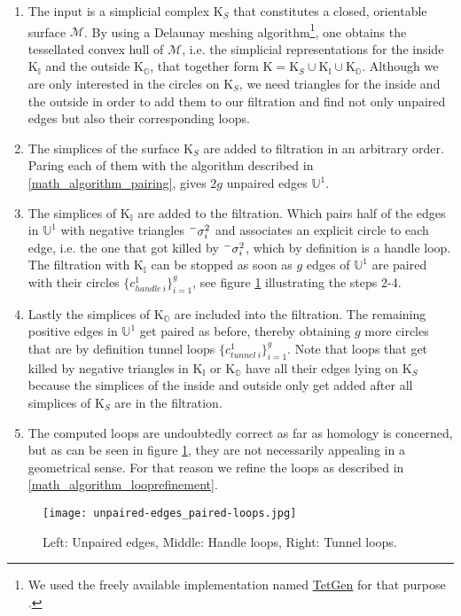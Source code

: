 \begin{enumerate}
\setlength{\itemsep}{0cm}
\setlength{\parskip}{0.15cm}
\item The input is a simplicial complex $\mathrm{K}_{S}$ that constitutes a closed, orientable surface $\mathcal{M}$. By using a Delaunay meshing algorithm\footnote{ We used the freely available implementation named \href{http://tetgen.berlios.de/}{TetGen} for that purpose \citep[cf.][]{Si2010}.}, one obtains the tessellated convex hull of $\mathcal{M}$, i.e. the simplicial representations for the inside $\mathrm{K}_{\mathbb{I}}$ and the outside $\mathrm{K}_{\mathbb{O}}$, that together form $\mathrm{K} = \mathrm{K}_{S} \cup \mathrm{K}_{\mathbb{I}} \cup \mathrm{K}_{\mathbb{O}}$. Although we are only interested in the circles on $\mathrm{K}_{S}$, we need triangles for the inside and the outside in order to add them to our filtration and find not only unpaired edges but also their corresponding loops.
\item The simplices of the surface $\mathrm{K}_{S}$ are added to filtration in an arbitrary order. Paring each of them with the algorithm described in \ref{math_algorithm_pairing}, gives $2g$ unpaired edges $\mathbb{U}^{1}$.
\item The simplices of $\mathrm{K}_{\mathbb{I}}$ are added to the filtration. Which pairs half of the edges in $\mathbb{U}^{1}$ with negative triangles $\Prefix^{-}{\sigma_{i}^{2}}$ and associates an explicit circle to each edge, i.e. the one that got killed by $\Prefix^{-}{\sigma_{i}^{2}}$, which by definition is a handle loop. The filtration with $\mathrm{K}_{\mathbb{I}}$ can be stopped as soon as $g$ edges of $\mathbb{U}^{1}$ are paired with their circles $\{c^{1}_{handle~i}\}^{g}_{i=1}$, see figure \ref{fig:unpaired-edges_paired-loops} illustrating the steps 2-4.
\item Lastly the simplices of $\mathrm{K}_{\mathbb{O}}$ are included into the filtration. The remaining positive edges in $\mathbb{U}^{1}$ get paired as before, thereby obtaining $g$ more circles that are by definition tunnel loops $\{c^{1}_{tunnel~i}\}^{g}_{i=1}$. Note that loops that get killed by negative triangles in $\mathrm{K}_{\mathbb{I}}$ or $\mathrm{K}_{\mathbb{O}}$ have all their edges lying on $\mathrm{K}_{S}$ because the simplices of the inside and outside only get added after all simplices of $\mathrm{K}_{S}$ are in the filtration.
\item The computed loops are undoubtedly correct as far as homology is concerned, but as can be seen in figure \ref{fig:unpaired-edges_paired-loops}, they are not necessarily appealing in a geometrical sense. For that reason we refine the loops as described in \ref{math_algorithm_looprefinement}.
\end{enumerate}
\begin{figure}[htb]
\centering
\texttt{[image: unpaired-edges\_paired-loops.jpg]}
\caption{Left: Unpaired edges, Middle: Handle loops, Right: Tunnel loops.}
\label{fig:unpaired-edges_paired-loops}
\bigskip
\end{figure}

